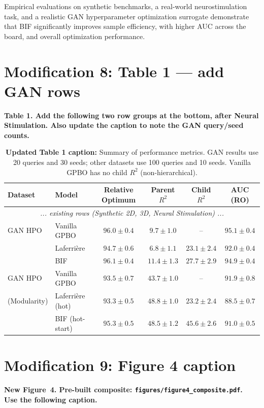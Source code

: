 \documentclass[11pt]{article}
\newcommand{\modloc}[1]{\noindent\colorbox{yellow!30}{\parbox{\dimexpr\textwidth-2\fboxsep}{%
\textbf{#1}}}\medskip}
\begin{document}
Empirical evaluations on synthetic benchmarks, a real-world
neurostimulation task, and a realistic GAN hyperparameter optimization surrogate
demonstrate that BIF significantly improves sample efficiency,
with higher AUC across the board, and overall optimization performance.

\section*{Modification 8: Table 1 --- add GAN rows}
\modloc{Table 1. Add the following two row groups at the bottom, after
Neural Stimulation. Also update the caption to note the GAN query/seed counts.}

\begin{table}[h]
\centering
\small
\begin{tabular}{llcccc}
\toprule
Dataset & Model & Relative Optimum & Parent $R^2$ & Child $R^2$ & AUC (RO) \\
\midrule
\multicolumn{6}{c}{\textit{... existing rows (Synthetic 2D, 3D, Neural Stimulation) ...}} \\
\midrule
GAN HPO         & Vanilla GPBO       & $96.0 \pm 0.4$ & $9.7 \pm 1.0$  & --              & $95.1 \pm 0.4$ \\
                & Laferri\`ere       & $94.7 \pm 0.6$ & $6.8 \pm 1.1$  & $23.1 \pm 2.4$  & $92.0 \pm 0.4$ \\
                & BIF                & $96.1 \pm 0.4$ & $11.4 \pm 1.3$ & $27.7 \pm 2.9$  & $94.9 \pm 0.4$ \\
\midrule
GAN HPO         & Vanilla GPBO       & $93.5 \pm 0.7$ & $43.7 \pm 1.0$ & --              & $91.9 \pm 0.8$ \\
(Modularity)    & Laferri\`ere (hot) & $93.3 \pm 0.5$ & $48.8 \pm 1.0$ & $23.2 \pm 2.4$  & $88.5 \pm 0.7$ \\
                & BIF (hot-start)    & $95.3 \pm 0.5$ & $48.5 \pm 1.2$ & $45.6 \pm 2.6$  & $91.0 \pm 0.5$ \\
\bottomrule
\end{tabular}
\caption*{\textbf{Updated Table 1 caption:} Summary of performance metrics.
GAN results use 20 queries and 30 seeds; other datasets use 100 queries
and 10 seeds. Vanilla GPBO has no child $R^2$ (non-hierarchical).}
\end{table}

\section*{Modification 9: Figure 4 caption}
\modloc{New Figure~4. Pre-built composite: \texttt{figures/figure4\_composite.pdf}.\\
Use the following caption.}
\end{document}
